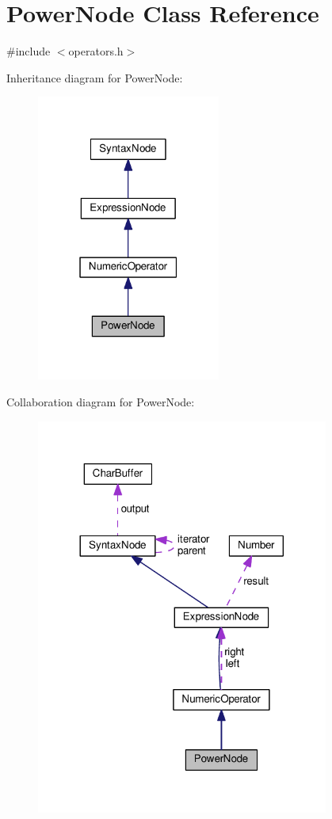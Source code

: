 \hypertarget{classPowerNode}{}\section{Power\+Node Class Reference}
\label{classPowerNode}


{\ttfamily \#include $<$operators.\+h$>$}



Inheritance diagram for Power\+Node\+:
\nopagebreak
\begin{figure}[H]
\begin{center}
\leavevmode
\includegraphics[width=171pt]{de/d80/classPowerNode__inherit__graph}
\end{center}
\end{figure}


Collaboration diagram for Power\+Node\+:
\nopagebreak
\begin{figure}[H]
\begin{center}
\leavevmode
\includegraphics[width=272pt]{d8/dd9/classPowerNode__coll__graph}
\end{center}
\end{figure}
